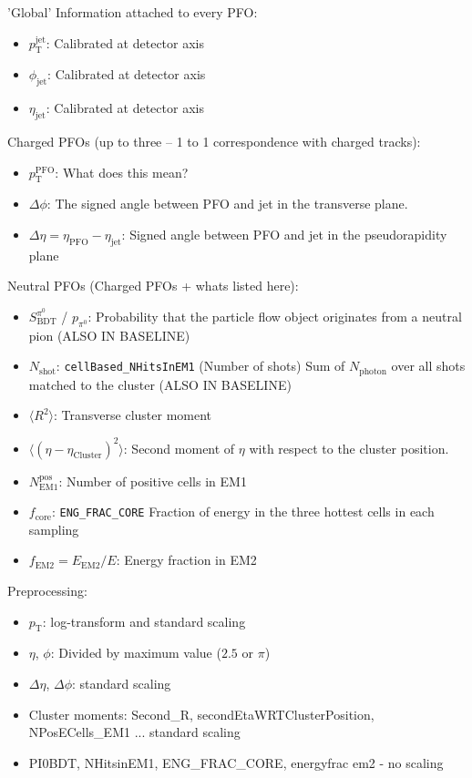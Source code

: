 'Global' Information attached to every PFO:
\begin{itemize}
\item $p_\text{T}^\text{jet}$: Calibrated at detector axis
\item $\phi_\text{jet}$: Calibrated at detector axis
\item $\eta_\text{jet}$: Calibrated at detector axis
\end{itemize}

Charged PFOs (up to three -- 1 to 1 correspondence with charged tracks):
\begin{itemize}
\item $p_\text{T}^\text{PFO}$: What does this mean?
\item $\Delta \phi$: The signed angle between PFO and jet in the transverse
  plane.
\item $\Delta \eta = \eta_\text{PFO} - \eta_\text{jet}$: Signed angle between
  PFO and jet in the pseudorapidity plane
\end{itemize}

Neutral PFOs (Charged PFOs + whats listed here):
\begin{itemize}
\item $S_\text{BDT}^{\pi^0}$ / $p_{\pi^0}$: Probability that the particle flow
  object originates from a neutral pion (ALSO IN BASELINE)
\item $N_\text{shot}$: \texttt{cellBased\_NHitsInEM1} (Number of shots) Sum of
  $N_\text{photon}$ over all shots matched to the cluster (ALSO IN BASELINE)
\item $\langle R^2 \rangle$: Transverse cluster moment
\item $\langle (\eta - \eta_\text{Cluster})^2 \rangle$: Second moment of $\eta$
  with respect to the cluster position.
\item $N_\text{EM1}^\text{pos}$: Number of positive cells in EM1
\item $f_\text{core}$: \texttt{ENG\_FRAC\_CORE} Fraction of energy in the three
  hottest cells in each sampling 
\item $f_\text{EM2} = E_\text{EM2} / E$: Energy fraction in EM2 
\end{itemize}

Preprocessing:
\begin{itemize}
\item $p_\text{T}$: log-transform and standard scaling
\item $\eta$, $\phi$: Divided by maximum value ($2.5$ or $\pi$)
\item $\Delta \eta$, $\Delta \phi$: standard scaling
\item Cluster moments: Second\_R, secondEtaWRTClusterPosition, NPosECells\_EM1
  ... standard scaling
\item PI0BDT, NHitsinEM1, ENG\_FRAC\_CORE, energyfrac em2 - no scaling
\end{itemize}

